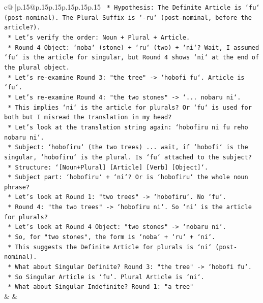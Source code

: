 \documentclass{article}
\begin{document}
{\begin{supertabular}{c@{$\;$}|p{.15\linewidth}@{}p{.15\linewidth}p{.15\linewidth}p{.15\linewidth}p{.15\linewidth}p{.15\linewidth}}
{{{\texttt{        *   Hypothesis: The Definite Article is `fu` (post{-}nominal). The Plural Suffix is `{-}ru` (post{-}nominal, before the article?).} \\
\texttt{        *   Let's verify the order: Noun + Plural + Article.} \\
\texttt{        *   Round 4 Object: `noba` (stone) + `ru` (two) + `ni`? Wait, I assumed `fu` is the article for singular, but Round 4 shows `ni` at the end of the plural object.} \\
\texttt{        *   Let's re{-}examine Round 3: "the tree" {-}> `hobofi fu`. Article is `fu`.} \\
\texttt{        *   Let's re{-}examine Round 4: "the two stones" {-}> `... nobaru ni`.} \\
\texttt{        *   This implies `ni` is the article for plurals? Or `fu` is used for both but I misread the translation in my head?} \\
\texttt{        *   Let's look at the translation string again: `hobofiru ni fu reho nobaru ni`.} \\
\texttt{        *   Subject: `hobofiru` (the two trees) ... wait, if `hobofi` is the singular, `hobofiru` is the plural. Is `fu` attached to the subject?} \\
\texttt{        *   Structure: `{[}Noun+Plural{]} {[}Article{]} {[}Verb{]} {[}Object{]}`.} \\
\texttt{        *   Subject part: `hobofiru` + `ni`? Or is `hobofiru` the whole noun phrase?} \\
\texttt{        *   Let's look at Round 1: "two trees" {-}> `hobofiru`. No `fu`.} \\
\texttt{        *   Round 4: "the two trees" {-}> `hobofiru ni`. So `ni` is the article for plurals?} \\
\texttt{        *   Let's look at Round 4 Object: "two stones" {-}> `nobaru ni`.} \\
\texttt{        *   So, for "two stones", the form is `noba` + `ru` + `ni`.} \\
\texttt{        *   This suggests the Definite Article for plurals is `ni` (post{-}nominal).} \\
\texttt{        *   What about Singular Definite? Round 3: "the tree" {-}> `hobofi fu`.} \\
\texttt{        *   So Singular Article is `fu`. Plural Article is `ni`.} \\
\texttt{        *   What about Singular Indefinite? Round 1: "a tree"} \\
            }
        }
    }
    & & \\ \\


\end{supertabular}}
\end{document}
